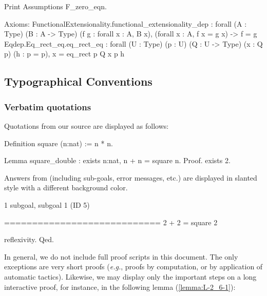 \documentclass[a4paper]{book}
\begin{document}
\begin{Coqsrc}
Print Assumptions F_zero_eqn. 
\end{Coqsrc}

\begin{Coqanswer}
Axioms:
FunctionalExtensionality.functional_extensionality_dep
  : forall (A : Type) (B : A -> Type) (f g : forall x : A, B x),
    (forall x : A, f x = g x) -> f = g
Eqdep.Eq_rect_eq.eq_rect_eq
  : forall (U : Type) (p : U) (Q : U -> Type) (x : Q p) (h : p = p),
    x = eq_rect p Q x p h
\end{Coqanswer}





\subsection{Typographical Conventions}

\subsubsection{Verbatim quotations}

Quotations from our  \coq{} source are displayed as follows:


  \begin{Coqsrc}
 Definition square (n:nat) := n * n.

 Lemma square_double : exists n:nat, n + n = square n.
 Proof.
    exists 2. 
  \end{Coqsrc}

Answers from \coq{} (including sub-goals, error messages, etc.) are displayed in slanted style
with a different background color.



 \begin{Coqanswer}
 1 subgoal, subgoal 1 (ID 5)
  
  ============================
   2 + 2 = square 2
   
 \end{Coqanswer}

 \begin{Coqsrc}
   reflexivity.
Qed.
 \end{Coqsrc}

In general, we do not include full proof scripts in this document. The only exceptions are very short proofs (\emph{e.g.}, proofs by computation, or by application of automatic tactics). Likewise, we may display only the important steps on a long interactive proof, for instance, in the following lemma (\vref{lemma:L-2_6-1}):
\end{document}

